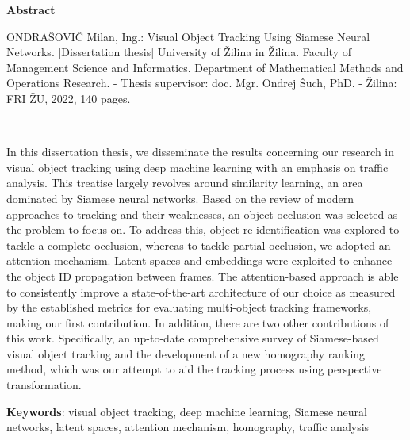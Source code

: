 \thispagestyle{empty}

\begin{center}
    \Large{\textbf{Abstract}}
\end{center}

\noindent ONDRAŠOVIČ Milan, Ing.: Visual Object Tracking Using Siamese Neural Networks.
    [Dissertation thesis] University of Žilina in Žilina. Faculty of Management Science and Informatics. Department of Mathematical Methods and Operations Research. - Thesis supervisor: doc. Mgr. Ondrej Šuch, PhD. - Žilina: FRI ŽU, 2022, 140 pages.

\

\noindent In this dissertation thesis, we disseminate the results concerning our research in visual object tracking using deep machine learning with an emphasis on traffic analysis. This treatise largely revolves around similarity learning, an area dominated by Siamese neural networks. Based on the review of modern approaches to tracking and their weaknesses, an object occlusion was selected as the problem to focus on. To address this, object re-identification was explored to tackle a complete occlusion, whereas to tackle partial occlusion, we adopted an attention mechanism. Latent spaces and embeddings were exploited to enhance the object ID propagation between frames. The attention-based approach is able to consistently improve a state-of-the-art architecture of our choice as measured by the established metrics for evaluating multi-object tracking frameworks, making our first contribution. In addition, there are two other contributions of this work. Specifically, an up-to-date comprehensive survey of Siamese-based visual object tracking and the development of a new homography ranking method, which was our attempt to aid the tracking process using perspective transformation.

\noindent \textbf{Keywords}: visual object tracking, deep machine learning, Siamese neural networks, latent spaces, attention mechanism, homography, traffic analysis
